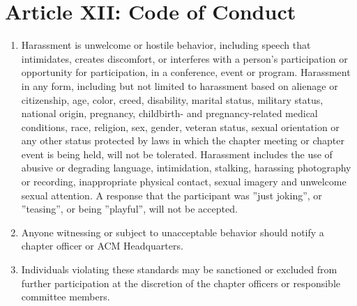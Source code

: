 \section*{Article XII: Code of Conduct}

\begin{enumerate}
    \item  Harassment is unwelcome or hostile behavior, including speech that intimidates, creates discomfort, or interferes with a person's participation or opportunity for participation, in a conference, event or program.
    Harassment in any form, including but not limited to harassment based on alienage or citizenship, age, color, creed, disability, marital status, military status, national origin, pregnancy, childbirth- and pregnancy-related medical conditions, race, religion, sex, gender, veteran status, sexual orientation or any other status protected by laws in which the chapter meeting or chapter event is being held, will not be tolerated.
    Harassment includes the use of abusive or degrading language, intimidation, stalking, harassing photography or recording, inappropriate physical contact, sexual imagery and unwelcome sexual attention.
    A response that the participant was ''just joking'', or ''teasing'', or being ''playful'', will not be accepted.
    \item Anyone witnessing or subject to unacceptable behavior should notify a chapter officer or ACM Headquarters.
    \item Individuals violating these standards may be sanctioned or excluded from further participation at the discretion of the chapter officers or responsible committee members.
\end{enumerate}
